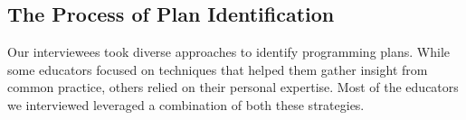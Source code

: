 












\subsection{The Process of Plan Identification}
\label{sec:process_intro_plan_design}
Our interviewees took diverse approaches to identify programming plans. While some educators focused on techniques that helped them gather insight from common practice,
others relied on their personal expertise. Most of the educators we interviewed leveraged a combination of both these strategies. 

